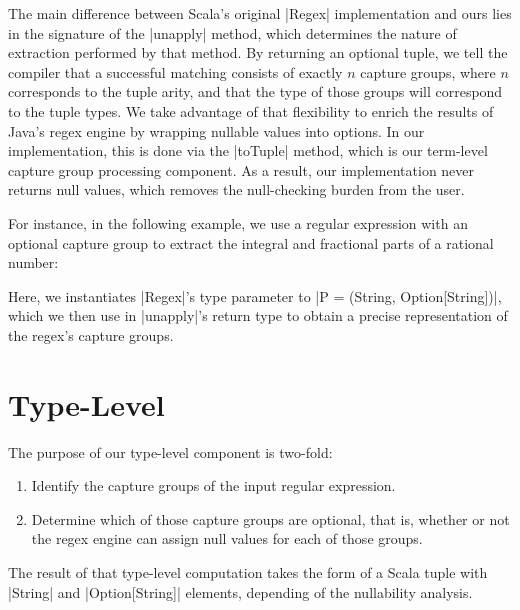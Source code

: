 The main difference between Scala's original |Regex| implementation and ours lies in the signature of the |unapply| method, which determines the nature of extraction performed by that method.
By returning an optional tuple, we tell the compiler that a successful matching consists of exactly $n$ capture groups, where $n$ corresponds to the tuple arity, and that the type of those groups will correspond to the tuple types.
We take advantage of that flexibility to enrich the results of Java's regex engine by wrapping nullable values into options.
In our implementation, this is done via the |toTuple| method, which is our
term-level capture group processing component.
As a result, our implementation never returns null values, which removes the null-checking burden from the user.

For instance, in the following example, we use a regular expression with an optional capture group to extract the integral and fractional parts of a rational number:

\regexRational

\noindent
Here, we instantiates |Regex|'s type parameter to |P = (String, Option[String])|, which we then use in |unapply|'s return type to obtain a precise representation of the regex's capture groups.

\section{Type-Level}
\label{sec:type-level}

The purpose of our type-level component is two-fold:

\begin{enumerate}
  \item Identify the capture groups of the input regular expression.
  \item Determine which of those capture groups are optional, that is, whether or not the regex engine can assign null values for each of those groups.
\end{enumerate}

\noindent
The result of that type-level computation takes the form of a Scala tuple with |String| and |Option[String]| elements, depending of the nullability analysis.

